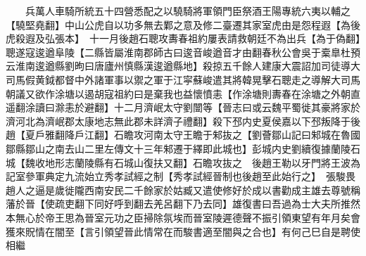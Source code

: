 　　兵萬人車騎所統五十四營悉配之以驍騎將軍領門臣祭酒王陽專統六夷以輔之【驍堅堯翻】中山公虎自以功多無去鄴之意及修二臺遷其家室虎由是怨程遐【為後虎殺遐及弘張本】　十一月後趙石聰攻夀春祖約屢表請救朝廷不為出兵【為于偽翻】聰遂寇逡遒阜陵【二縣皆屬淮南郡師古曰逡音峻遒音才由翻春秋公會吳于槖臯杜預云淮南逡遒縣劉昫曰唐廬州慎縣漢逡遒縣地】殺掠五千餘人建康大震詔加司徒導大司馬假黄鉞都督中外諸軍事以禦之軍于江寜蘇峻遣其將韓晃擊石聰走之導解大司馬朝議又欲作涂塘以遏胡寇祖約曰是棄我也益懷憤恚【作涂塘則夀春在涂塘之外朝直遥翻涂讀曰滁恚於避翻】十二月濟岷太守劉闓等【晉志曰或云魏平蜀徙其豪將家於濟河北為濟岷郡太康地志無此郡未詳濟子禮翻】殺下邳内史夏侯嘉以下邳叛降于後趙【夏戶雅翻降戶江翻】石瞻攻河南太守王瞻于邾抜之【劉薈鄒山記曰邾城在魯國鄒縣鄒山之南去山二里左傳文十三年邾遷于繹即此城也】彭城内史劉續復據蘭陵石城【魏收地形志蘭陵縣有石城山復扶又翻】石瞻攻抜之　後趙王勒以牙門將王波為記室參軍典定九流始立秀孝試經之制【秀孝試經晉制也後趙至此始行之】　張駿畏趙人之逼是歲徙隴西南安民二千餘家於姑臧又遣使修好於成以書勸成主雄去尊號稱藩於晉【使疏吏翻下同好呼到翻去羌呂翻下乃去同】雄復書曰吾過為士大夫所推然本無心於帝王思為晉室元功之臣掃除氛埃而晉室陵遲德聲不振引領東望有年月矣會獲來貺情在闇至【言引領望晉此情常在而駿書適至闇與之合也】有何己巳自是聘使相繼

